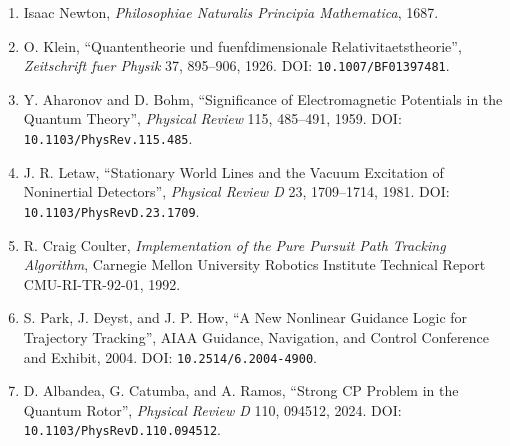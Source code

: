 \documentclass[
  a4paper,
]{ltjsarticle}
\providecommand{\tightlist}{%
  \setlength{\itemsep}{0pt}\setlength{\parskip}{0pt}}
\begin{document}
\begin{enumerate}
\def\labelenumi{\arabic{enumi}.}
\setcounter{enumi}{5}
\tightlist
\item
  Isaac Newton, \emph{Philosophiae Naturalis Principia Mathematica},
  1687.
\item
  O. Klein, ``Quantentheorie und fuenfdimensionale
  Relativitaetstheorie'', \emph{Zeitschrift fuer Physik} 37, 895--906,
  1926. DOI: \texttt{10.1007/BF01397481}.
\item
  Y. Aharonov and D. Bohm, ``Significance of Electromagnetic Potentials
  in the Quantum Theory'', \emph{Physical Review} 115, 485--491, 1959.
  DOI: \texttt{10.1103/PhysRev.115.485}.
\item
  J. R. Letaw, ``Stationary World Lines and the Vacuum Excitation of
  Noninertial Detectors'', \emph{Physical Review D} 23, 1709--1714,
  1981. DOI: \texttt{10.1103/PhysRevD.23.1709}.
\item
  R. Craig Coulter, \emph{Implementation of the Pure Pursuit Path
  Tracking Algorithm}, Carnegie Mellon University Robotics Institute
  Technical Report CMU-RI-TR-92-01, 1992.
\item
  S. Park, J. Deyst, and J. P. How, ``A New Nonlinear Guidance Logic for
  Trajectory Tracking'', AIAA Guidance, Navigation, and Control
  Conference and Exhibit, 2004. DOI: \texttt{10.2514/6.2004-4900}.
\item
  D. Albandea, G. Catumba, and A. Ramos, ``Strong CP Problem in the
  Quantum Rotor'', \emph{Physical Review D} 110, 094512, 2024. DOI:
  \texttt{10.1103/PhysRevD.110.094512}.
\end{enumerate}
\end{document}
